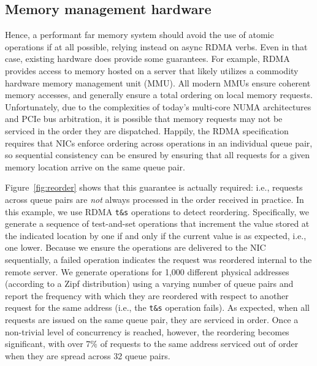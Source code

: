 \subsection{Memory management hardware}

Hence, a performant far memory system should avoid the use of atomic operations
if at all possible, relying instead on async RDMA verbs.  Even in that case,
existing hardware does provide some guarantees.  For example, RDMA provides
access to memory hosted on a server that likely utilizes a commodity hardware
memory management unit (MMU).  All modern MMUs ensure coherent memory accesses,
and generally ensure a total ordering on local memory requests.  Unfortunately,
due to the complexities of today's multi-core NUMA architectures and PCIe bus
arbitration, it is possible that memory requests may not be serviced in the
order they are dispatched. Happily, the RDMA specification requires that NICs
enforce ordering across operations in an individual queue pair, so sequential
consistency can be ensured by ensuring that all requests for a given memory
location arrive on the same queue pair.


Figure~\ref{fig:reorder} shows that this guarantee is actually required: i.e.,
requests across queue pairs are \emph{not} always processed in the order
received in practice.  In this example, we use RDMA \texttt{t\&s} operations to
detect reordering.  Specifically, we generate a sequence of test-and-set
operations that increment the value stored at the indicated location by one if
and only if the current value is as expected, i.e., one lower.  Because we
ensure the operations are delivered to the NIC sequentially, a failed operation
indicates the request was reordered internal to the remote server.  We generate
operations for 1,000 different physical addresses (according to a Zipf
distribution) using a varying number of queue pairs and report the frequency
with which they are reordered with respect to another request for the same
address (i.e., the \texttt{t\&s} operation fails).  As expected, when all
requests are issued on the same queue pair, they are serviced in order.  Once a
non-trivial level of concurrency is reached, however, the reordering becomes
significant, with over 7\% of requests to the same address serviced out of order
when they are spread across 32 queue pairs.


